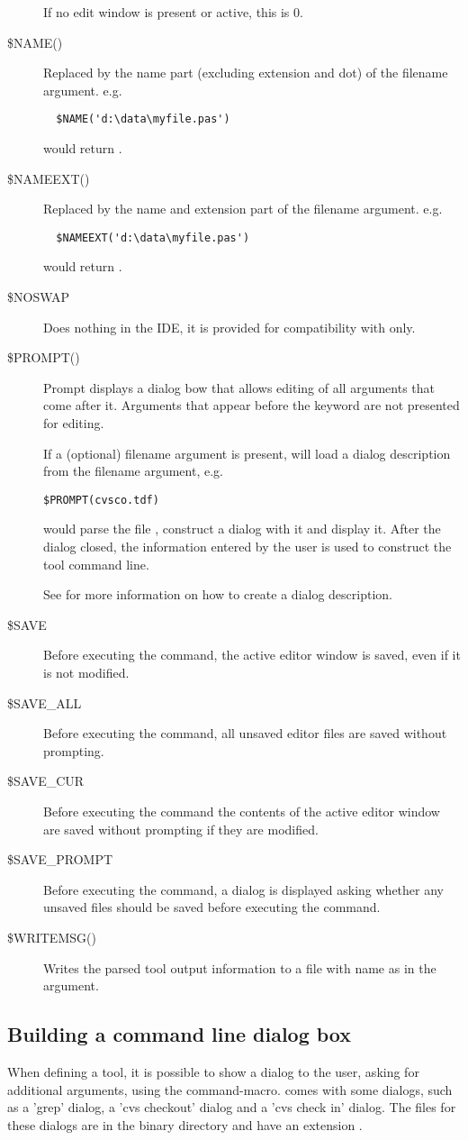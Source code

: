 \begin{description}
If no edit window is present or active, this is 0.
\item[\$NAME()]
Replaced by the name part (excluding extension and dot) of the filename
argument.
e.g.
\begin{verbatim}
  $NAME('d:\data\myfile.pas')
\end{verbatim}
would return .
\item[\$NAMEEXT()]
Replaced by the name and extension part of the filename argument.
e.g.
\begin{verbatim}
  $NAMEEXT('d:\data\myfile.pas')
\end{verbatim}
would return .
\item[\$NOSWAP]
Does nothing in the IDE, it is provided for compatibility with \tp only.
\item[\$PROMPT()]
Prompt displays a dialog bow that allows editing of all arguments that
come after it. Arguments that appear before the  keyword
are not presented for editing.

If a (optional) filename argument is present,  will load
a dialog description from the filename argument, e.g.
\begin{verbatim}
$PROMPT(cvsco.tdf)
\end{verbatim}
would parse the file , construct a dialog with it and
display it. After the dialog closed, the information entered by the user
is used to construct the tool command line.

See  for more information on how to create a dialog
description.
\item[\$SAVE]
Before executing the command, the active editor window is saved, even if it is not modified.
\item[\$SAVE\_ALL]
Before executing the command, all unsaved editor files are saved without prompting.
\item[\$SAVE\_CUR]
Before executing the command the contents of the active editor window are
saved without prompting if they are modified.
\item[\$SAVE\_PROMPT]
Before executing the command, a dialog is displayed asking whether any
unsaved files should be saved before executing the command.
\item[\$WRITEMSG()]
Writes the parsed tool output information to a file with name as in the argument.
\end{description}	

\subsection{Building a command line dialog box}
\label{se:commanddialogs}
When defining a tool, it is possible to show a dialog to the user, asking for
additional arguments, using the  command-macro.
\fpc comes with some dialogs, such as a 'grep' dialog, a 'cvs checkout' dialog
and a 'cvs check in' dialog. The files for these dialogs are in the binary
directory and have an extension .

